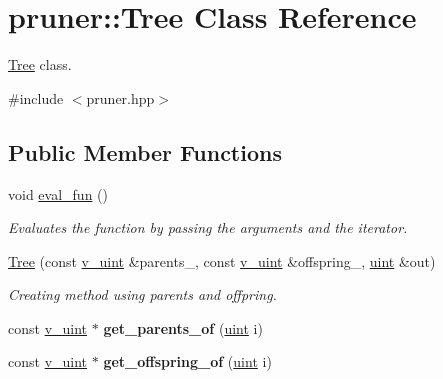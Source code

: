 \hypertarget{classpruner_1_1Tree}{}\section{pruner\+:\+:Tree Class Reference}
\label{classpruner_1_1Tree}


\hyperlink{classpruner_1_1Tree}{Tree} class.  




{\ttfamily \#include $<$pruner.\+hpp$>$}

\subsection*{Public Member Functions}
\begin{DoxyCompactItemize}
\item 
void \hyperlink{classpruner_1_1Tree_abaa9ef6d7eacf37302d29c12c2180c3a}{eval\+\_\+fun} ()\hypertarget{classpruner_1_1Tree_abaa9ef6d7eacf37302d29c12c2180c3a}{}\label{classpruner_1_1Tree_abaa9ef6d7eacf37302d29c12c2180c3a}

\begin{DoxyCompactList}\small\item\em Evaluates the function by passing the arguments and the iterator. \end{DoxyCompactList}\item 
\hyperlink{classpruner_1_1Tree_a0f964d9ba9834822d3e18946a5361839}{Tree} (const \hyperlink{namespacepruner_af0145646bd7ede012cd336b416bc5579}{v\+\_\+uint} \&parents\+\_\+, const \hyperlink{namespacepruner_af0145646bd7ede012cd336b416bc5579}{v\+\_\+uint} \&offspring\+\_\+, \hyperlink{namespacepruner_a659e6e64a9e2b8e981c3d34262a2f67e}{uint} \&out)
\begin{DoxyCompactList}\small\item\em Creating method using parents and offpring. \end{DoxyCompactList}\item 
const \hyperlink{namespacepruner_af0145646bd7ede012cd336b416bc5579}{v\+\_\+uint} $\ast$ {\bfseries get\+\_\+parents\+\_\+of} (\hyperlink{namespacepruner_a659e6e64a9e2b8e981c3d34262a2f67e}{uint} i)\hypertarget{classpruner_1_1Tree_a63ce508227afee3535e6ebc1bf864ab1}{}\label{classpruner_1_1Tree_a63ce508227afee3535e6ebc1bf864ab1}

\item 
const \hyperlink{namespacepruner_af0145646bd7ede012cd336b416bc5579}{v\+\_\+uint} $\ast$ {\bfseries get\+\_\+offspring\+\_\+of} (\hyperlink{namespacepruner_a659e6e64a9e2b8e981c3d34262a2f67e}{uint} i)\hypertarget{classpruner_1_1Tree_aa1cb5b73d8071e8c5b8be1ec29b54519}{}\label{classpruner_1_1Tree_aa1cb5b73d8071e8c5b8be1ec29b54519}


\end{DoxyCompactItemize}
